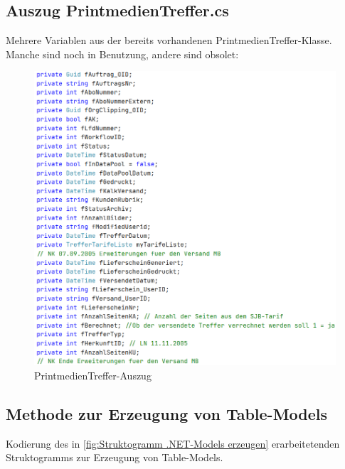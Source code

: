 \documentclass[11pt,toc=sectionentrywithoutdots, 
headheight=44pt, headings=optiontoheadandtoc, hyperfootnotes=false, hypertexnames=false]{scrartcl}
\begin{document}
 \subsection{Auszug PrintmedienTreffer.cs}
 \label{fig:PrintmedienTreffer.cs}
Mehrere Variablen aus der bereits vorhandenen PrintmedienTreffer-Klasse. Manche sind noch in Benutzung, andere sind obsolet:
 \begin{figure}[htp]
 \centering

	\includegraphics[scale=0.7]{PrintmedienTreffer.png}
	 \caption{PrintmedienTreffer-Auszug}
 \end{figure}
 \clearpage 


 
 

\subsection{Methode zur Erzeugung von Table-Models}
Kodierung des in \ref{fig:Struktogramm .NET-Models erzeugen} erarbeitetenden Struktogramms zur Erzeugung von Table-Models. 
 \label{fig:Methode zur Erzeugung von Table-Models}
\end{document}
